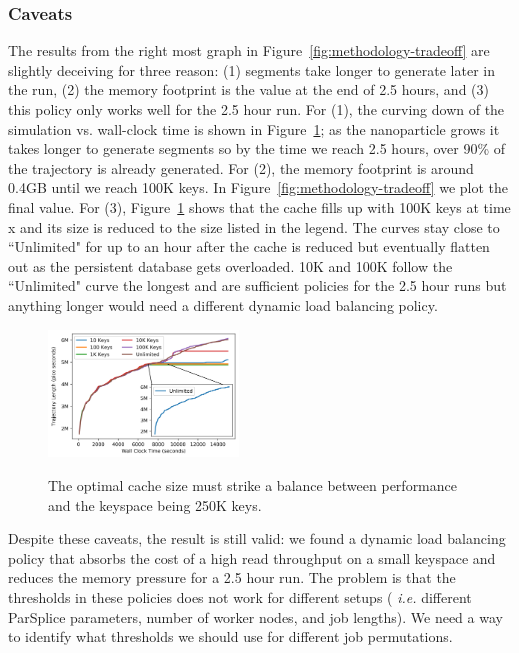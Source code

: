 \subsubsection*{Caveats}

The results from the right most graph in Figure~\ref{fig:methodology-tradeoff}
are slightly deceiving for three reason: (1) segments take longer to generate
later in the run, (2) the memory footprint is the value at the end of 2.5
hours, and (3) this policy only works well for the 2.5 hour run.  For (1), the
curving down of the simulation vs. wall-clock time is shown in
Figure~\ref{fig:methodology-trajectory}; as the nanoparticle grows it takes
longer to generate segments so by the time we reach 2.5 hours, over 90\% of the
trajectory is already generated.  For (2), the memory footprint is around 0.4GB
until we reach 100K keys. In Figure~\ref{fig:methodology-tradeoff} we plot the
final value. For (3), Figure~\ref{fig:methodology-trajectory} shows that the
cache fills up with 100K keys at time x and its size is reduced to the size
listed in the legend.  The curves stay close to ``Unlimited" for up to an hour
after the cache is reduced but eventually flatten out as the persistent
database gets overloaded. 10K and 100K follow the ``Unlimited" curve the
longest and are sufficient policies for the 2.5 hour runs but anything longer
would need a different dynamic load balancing policy.

\begin{figure}[tbh]
  \noindent\includegraphics[width=0.45\textwidth]{figures/methodology-trajectory.png}\\
  \caption{The optimal cache size must strike a balance between performance and
  the keyspace being 250K keys. \label{fig:methodology-trajectory}}
\end{figure}

Despite these caveats, the result is still valid: we found a dynamic load
balancing policy that absorbs the cost of a high read throughput on a small
keyspace and reduces the memory pressure for a 2.5 hour run. The problem is
that the thresholds in these policies does not work for different setups ({\it
i.e.} different ParSplice parameters, number of worker nodes, and job lengths).
We need a way to identify what thresholds we should use for different job
permutations.


